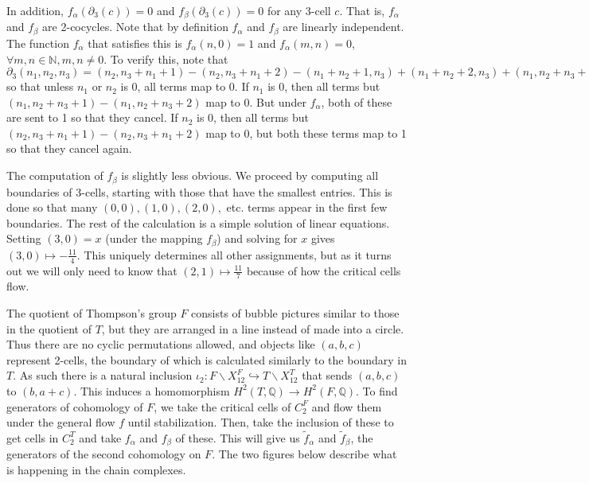 \documentclass{amsart}
\newcommand{\bq}{\ensuremath{\mathbb{Q}}} %
\begin{document}
In addition, $f_{\alpha}(\partial_{3}(c))=0$ and $f_{\beta}(\partial_{3}(c))=0$ for any 3-cell $c$. That is, $f_{\alpha}$ and $f_{\beta}$ are 2-cocycles. Note that by definition $f_{\alpha}$ and $f_{\beta}$ are linearly independent. The function $f_{\alpha}$ that satisfies this is $f_{\alpha}(n,0) = 1$ and $f_{\alpha}(m,n) = 0$, $\forall m,n \in \mathbb{N}, m,n \neq 0$. To verify this, note that $\partial_{3}(n_{1},n_{2},n_{3}) = (n_{2},n_{3}+n_{1}+1)-(n_{2},n_{3}+n_{1}+2)-(n_{1}+n_{2}+1,n_{3})+(n_{1}+n_{2}+2,n_{3})+(n_{1},n_{2}+n_{3}+1)-(n_{1},n_{2}+n_{3}+2)$ so that unless $n_{1}$ or $n_{2}$ is 0, all terms map to 0. If $n_{1}$ is 0, then all terms but $(n_{1},n_{2}+n_{3}+1)-(n_{1},n_{2}+n_{3}+2)$ map to 0. But under $f_{\alpha}$, both of these are sent to 1 so that they cancel. If $n_{2}$ is 0, then all terms but $(n_{2},n_{3}+n_{1}+1)-(n_{2},n_{3}+n_{1}+2)$ map to 0, but both these terms map to 1 so that they cancel again.

The computation of $f_{\beta}$ is slightly less obvious. We proceed by computing all boundaries of 3-cells, starting with those that have the smallest entries. This is done so that many $(0,0), (1,0), (2,0),$ etc. terms appear in the first few boundaries. The rest of the calculation is a simple solution of linear equations. Setting $(3,0) = x$ (under the mapping $f_{\beta}$) and solving for $x$ gives $(3,0) \mapsto -\frac{11}{4}$. This uniquely determines all other assignments, but as it turns out we will only need to know that $(2,1) \mapsto \frac{11}{7}$ because of how the critical cells flow.

The quotient of Thompson's group $F$ consists of bubble pictures similar to those in the quotient of $T$, but they are arranged in a line instead of made into a circle. Thus there are no cyclic permutations allowed, and objects like $(a,b,c)$ represent 2-cells, the boundary of which is calculated similarly to the boundary in $T$. As such there is a natural inclusion $\iota_{2}: F\backslash X^F_{12} \hookrightarrow T\backslash X^T_{12}$ that sends $(a,b,c)$ to $(b,a+c)$. This induces a homomorphism $H^2(T, \bq) \to H^2(F, \bq)$. To find generators of cohomology of $F$, we take the critical cells of $C^F_2$ and flow them under the general flow $f$ until stabilization. Then, take the inclusion of these to get cells in $C^T_2$ and take $f_{\alpha}$ and $f_{\beta}$ of these. This will give us $\widetilde{f}_{\alpha}$ and $\widetilde{f}_{\beta}$, the generators of the second cohomology on $F$. The two figures below describe what is happening in the chain complexes.
\end{document}
